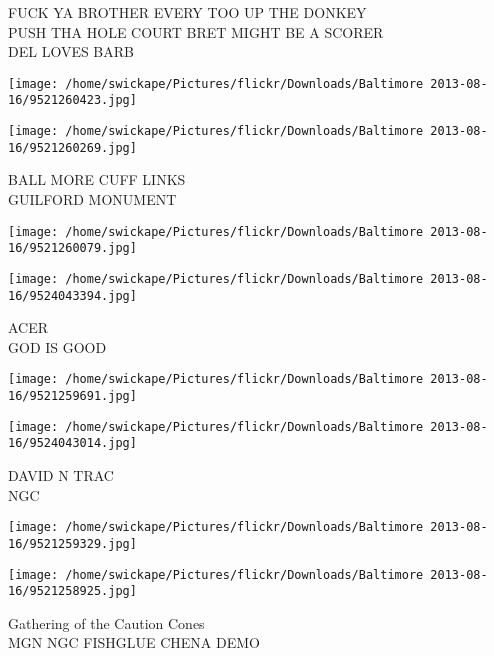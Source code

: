 \documentclass[10pt,letterpaper]{article}
\begin{document}
FUCK YA BROTHER EVERY TOO UP THE DONKEY\\
PUSH THA HOLE COURT BRET MIGHT BE A SCORER\\
DEL LOVES BARB\\
\pagebreak

\texttt{[image: /home/swickape/Pictures/flickr/Downloads/Baltimore 2013-08-16/9521260423.jpg]}

\vspace{0.25in}
\texttt{[image: /home/swickape/Pictures/flickr/Downloads/Baltimore 2013-08-16/9521260269.jpg]}

BALL MORE CUFF LINKS\\
GUILFORD MONUMENT\\
\pagebreak

\texttt{[image: /home/swickape/Pictures/flickr/Downloads/Baltimore 2013-08-16/9521260079.jpg]}

\vspace{0.25in}
\texttt{[image: /home/swickape/Pictures/flickr/Downloads/Baltimore 2013-08-16/9524043394.jpg]}

ACER\\
GOD IS GOOD\\
\pagebreak

\texttt{[image: /home/swickape/Pictures/flickr/Downloads/Baltimore 2013-08-16/9521259691.jpg]}

\vspace{0.25in}
\texttt{[image: /home/swickape/Pictures/flickr/Downloads/Baltimore 2013-08-16/9524043014.jpg]}

DAVID N TRAC\\
NGC\\
\pagebreak

\texttt{[image: /home/swickape/Pictures/flickr/Downloads/Baltimore 2013-08-16/9521259329.jpg]}

\vspace{0.25in}
\texttt{[image: /home/swickape/Pictures/flickr/Downloads/Baltimore 2013-08-16/9521258925.jpg]}

Gathering of the Caution Cones\\
MGN NGC FISHGLUE CHENA DEMO\\
\pagebreak
\end{document}
